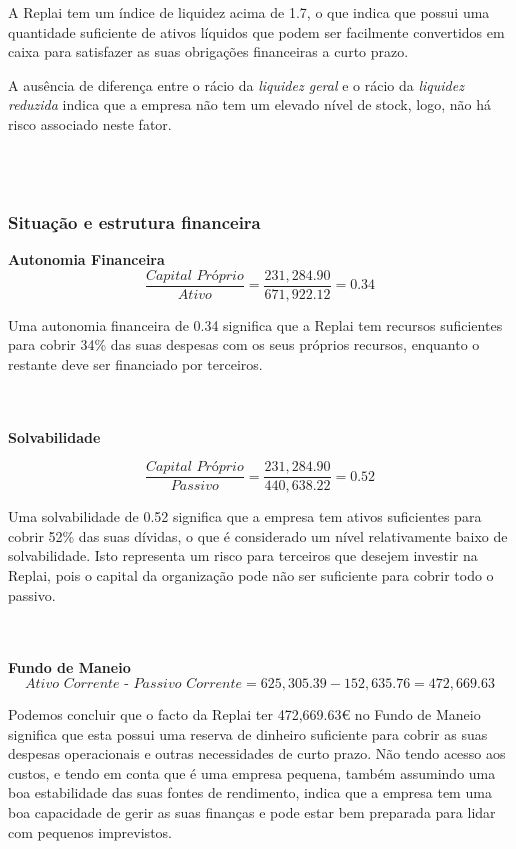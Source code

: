 A Replai tem um índice de liquidez acima de 1.7, o que indica que possui uma quantidade suficiente de ativos líquidos que podem ser facilmente convertidos em caixa para satisfazer as suas obrigações financeiras a curto prazo.

A ausência de diferença entre o rácio da \textit{liquidez geral} e o rácio da \textit{liquidez reduzida} indica que a empresa não tem um elevado nível de stock, logo, não há risco associado neste fator. 


\hrulefill
\\~\\
\newpage
\subsubsection{Situação e estrutura financeira}
\textbf{Autonomia Financeira}\\

\[
    \frac{\textit{Capital Próprio}}{\textit{Ativo}} = \frac{231,284.90}{671,922.12} = 0.34
\]

Uma autonomia financeira de 0.34 significa que a Replai tem recursos suficientes para cobrir 34\% das suas despesas com os seus próprios recursos, enquanto o restante deve ser financiado por terceiros.

\hrulefill
\\~\\

\textbf{Solvabilidade}

\[
    \frac{\textit{Capital Próprio}}{\textit{Passivo}} = \frac{231,284.90}{440,638.22} = 0.52
\]

Uma solvabilidade de 0.52 significa que a empresa tem ativos suficientes para cobrir 52\% das suas dívidas, o que é considerado um nível relativamente baixo de solvabilidade. Isto representa um risco para terceiros que desejem investir na Replai, pois o capital da organização pode não ser suficiente para cobrir todo o passivo.

\hrulefill
\\~\\

\textbf{Fundo de Maneio}\\

\[
    \textit{Ativo Corrente - Passivo Corrente} = 625,305.39 - 152,635.76 = 472,669.63
\]

Podemos concluir que o facto da Replai ter 472,669.63€ no Fundo de Maneio significa que esta possui uma reserva de dinheiro suficiente para cobrir as suas despesas operacionais e outras necessidades de curto prazo. Não tendo acesso aos custos, e tendo em conta que é uma empresa pequena, também assumindo uma boa estabilidade das suas fontes de rendimento, indica que a empresa tem uma boa capacidade de gerir as suas finanças e pode estar bem preparada para lidar com pequenos imprevistos. 


